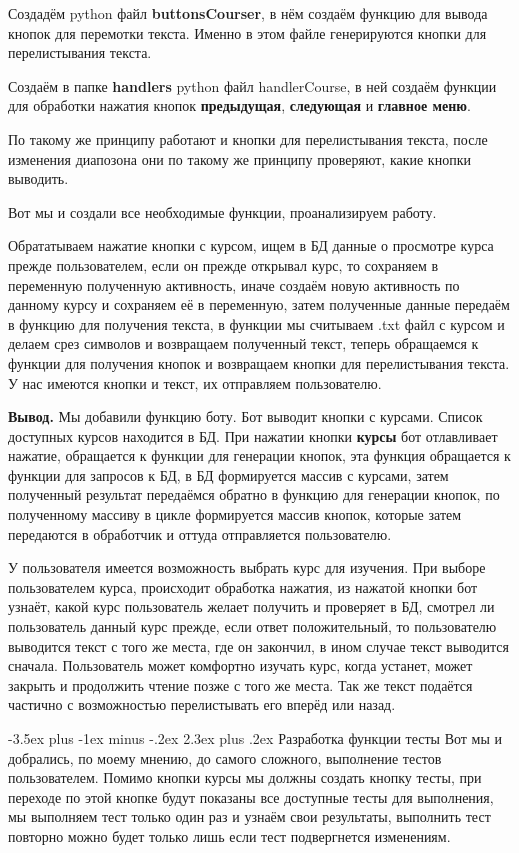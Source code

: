 \documentclass[12pt, oldlfont, amsfonts]{report}
\makeatletter
\renewcommand{\section}{\@startsection{section}{1}{0pt}%
                                {-3.5ex plus -1ex minus -.2ex}%
                                {2.3ex plus .2ex}%
{\centering\hyphenpenalty=10000\normalfont\Large\bfseries}}
\makeatother
\begin{document}
Создадём python файл {\bf buttonsCourser}, в нём создаём функцию для вывода кнопок для перемотки текста. Именно в этом файле генерируются кнопки для перелистывания текста.

Создаём в папке {\bf handlers} python файл {handlerCourse}, в ней создаём функции для обработки нажатия кнопок  {\bf предыдущая}, {\bf следующая} и {\bf главное меню}.

По такому же принципу работают и кнопки для перелистывания текста, после изменения диапозона они по такому же принципу проверяют, какие кнопки выводить.

Вот мы и создали все необходимые функции, проанализируем работу.

Обрататываем нажатие кнопки с курсом, ищем в БД данные о просмотре курса прежде пользователем, если он прежде открывал курс, то сохраняем в переменную полученную активность, иначе создаём новую активность по данному курсу и сохраняем её в переменную, затем полученные данные передаём в функцию для получения текста, в функции мы считываем .txt файл с курсом и делаем срез символов и возвращаем полученный текст, теперь обращаемся к функции для получения кнопок и возвращаем кнопки для перелистывания текста.
У нас имеются кнопки и текст, их отправляем пользователю.

{\bf Вывод.} Мы добавили функцию боту. Бот выводит кнопки с курсами. Список доступных курсов находится в БД. При нажатии кнопки {\bf курсы} бот отлавливает нажатие, обращается к функции для генерации кнопок, эта функция обращается к функции для запросов к БД, в БД формируется массив с курсами, затем полученный результат передаёмся обратно в функцию для генерации кнопок, по полученному массиву в цикле формируется массив кнопок, которые затем передаются в обработчик и оттуда отправляется пользователю.  

У пользователя имеется возможность выбрать курс для изучения. При выборе пользователем курса, происходит обработка нажатия, из нажатой кнопки бот узнаёт, какой курс пользователь желает получить и проверяет в БД, смотрел ли пользователь данный курс прежде, если ответ положительный, то пользователю выводится текст с того же места, где он закончил, в ином случае текст выводится сначала. Пользователь может комфортно изучать курс, когда устанет, может закрыть и продолжить чтение позже с того же места. Так же текст подаётся частично с возможностью перелистывать его вперёд или назад.

\section{Разработка функции тесты}
Вот мы и добрались, по моему мнению, до самого сложного, выполнение тестов пользователем. Помимо кнопки курсы мы должны создать кнопку тесты, при переходе по этой кнопке будут показаны все доступные тесты для выполнения, мы выполняем тест только один раз и узнаём свои результаты, выполнить тест повторно можно будет только лишь если тест подвергнется изменениям.
\end{document}
